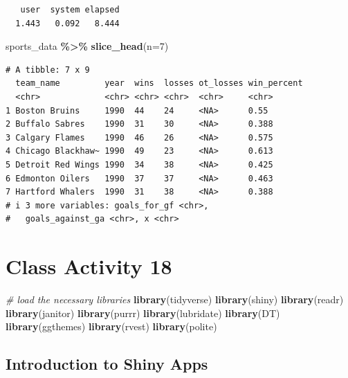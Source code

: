\documentclass[
]{book}
\newenvironment{Shaded}{\begin{snugshade}}{\end{snugshade}}
\newcommand{\AttributeTok}[1]{\textcolor[rgb]{0.13,0.29,0.53}{#1}}
\newcommand{\CommentTok}[1]{\textcolor[rgb]{0.56,0.35,0.01}{\textit{#1}}}
\newcommand{\DecValTok}[1]{\textcolor[rgb]{0.00,0.00,0.81}{#1}}
\newcommand{\FunctionTok}[1]{\textcolor[rgb]{0.13,0.29,0.53}{\textbf{#1}}}
\newcommand{\NormalTok}[1]{#1}
\newcommand{\SpecialCharTok}[1]{\textcolor[rgb]{0.81,0.36,0.00}{\textbf{#1}}}
\begin{document}
\begin{verbatim}
   user  system elapsed 
  1.443   0.092   8.444 
\end{verbatim}

\begin{Shaded}
\begin{Highlighting}[]
\NormalTok{sports\_data }\SpecialCharTok{\%\textgreater{}\%} \FunctionTok{slice\_head}\NormalTok{(}\AttributeTok{n=}\DecValTok{7}\NormalTok{)}
\end{Highlighting}
\end{Shaded}

\begin{verbatim}
# A tibble: 7 x 9
  team_name         year  wins  losses ot_losses win_percent
  <chr>             <chr> <chr> <chr>  <chr>     <chr>      
1 Boston Bruins     1990  44    24     <NA>      0.55       
2 Buffalo Sabres    1990  31    30     <NA>      0.388      
3 Calgary Flames    1990  46    26     <NA>      0.575      
4 Chicago Blackhaw~ 1990  49    23     <NA>      0.613      
5 Detroit Red Wings 1990  34    38     <NA>      0.425      
6 Edmonton Oilers   1990  37    37     <NA>      0.463      
7 Hartford Whalers  1990  31    38     <NA>      0.388      
# i 3 more variables: goals_for_gf <chr>,
#   goals_against_ga <chr>, x <chr>
\end{verbatim}

\hypertarget{class-activity-18}{%
\chapter{Class Activity 18}\label{class-activity-18}}

\begin{Shaded}
\begin{Highlighting}[]
\CommentTok{\# load the necessary libraries}
\FunctionTok{library}\NormalTok{(tidyverse)}
\FunctionTok{library}\NormalTok{(shiny)}
\FunctionTok{library}\NormalTok{(readr)}
\FunctionTok{library}\NormalTok{(janitor)}
\FunctionTok{library}\NormalTok{(purrr)}
\FunctionTok{library}\NormalTok{(lubridate)}
\FunctionTok{library}\NormalTok{(DT)}
\FunctionTok{library}\NormalTok{(ggthemes)}
\FunctionTok{library}\NormalTok{(rvest)}
\FunctionTok{library}\NormalTok{(polite)}
\end{Highlighting}
\end{Shaded}

\hypertarget{introduction-to-shiny-apps}{%
\section{Introduction to Shiny Apps}\label{introduction-to-shiny-apps}}
\end{document}
